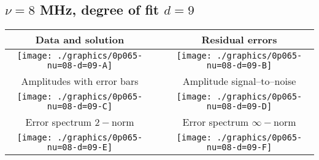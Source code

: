 

% 

\clearpage{}
\break{}

\subsection{$\nu = 8$ MHz, degree of fit $d = 9$}

\begin{table}[h]
    \begin{center}
        \begin{tabular}{ccc}
            Data and solution & \quad & Residual errors \\\hline
            \texttt{[image: ./graphics/0p065-nu=08-d=09-A]} &&
            \texttt{[image: ./graphics/0p065-nu=08-d=09-B]} \\[15pt]
            Amplitudes with error bars && Amplitude signal--to--noise \\\hline
            \texttt{[image: ./graphics/0p065-nu=08-d=09-C]} &&
            \texttt{[image: ./graphics/0p065-nu=08-d=09-D]} \\[15pt]
            Error spectrum $2-$norm && Error spectrum $\infty-$norm \\\hline
            \texttt{[image: ./graphics/0p065-nu=08-d=09-E]} &&
            \texttt{[image: ./graphics/0p065-nu=08-d=09-F]} \\[15pt]
        \end{tabular}
    \end{center}
\label{fig:elev=65, nu=8}
\end{table}



\endinput
